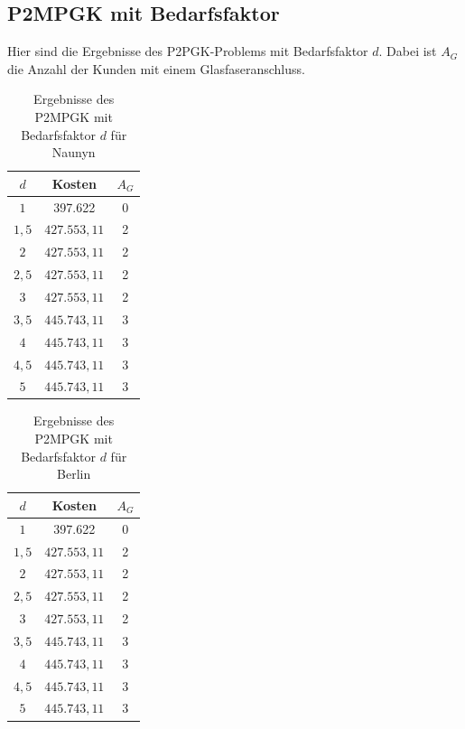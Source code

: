 \documentclass[11pt,a4paper]{article}
\theoremstyle{my_th_style1}
\begin{document}
\subsection*{P2MPGK mit Bedarfsfaktor}
Hier sind die Ergebnisse des P2PGK-Problems mit Bedarfsfaktor $d$. Dabei ist $A_G$ die Anzahl der Kunden mit einem Glasfaseranschluss.
\begin{table}[h]
	\centering
		\begin{tabular}{c|c|c}
	\centering
	$d$ & Kosten & $A_G$ \\	
	\hline
	$1$   	 &  397.622 & 0  \\
	$1,5$ 	&   $427.553,11$  & 2  \\
	$2$   	&   $427.553,11$ & 2  \\
	$2,5$   	&   $427.553,11$ & 2  \\
	$3$    &   $427.553,11$ & 2  \\
	$3,5$   	&   $445.743,11$ & 3  \\
	$4$   	&   $445.743,11$& 3  \\
	$4,5$    & $445.743,11$ & 3 \\
	$5$   	&   $445.743,11$& 3  \\
\end{tabular}
	\label{P2MPGKBedarfN}
	\caption{Ergebnisse des P2MPGK mit Bedarfsfaktor $d$ f\"ur Naunyn} 
\end{table}

\begin{table}[h]
			\centering
			\begin{tabular}{c|c|c}
				\centering
				$d$ & Kosten & $A_G$ \\	
		\hline
	$1$   	 &  397.622 & 0  \\
	$1,5$ 	&   $427.553,11$  & 2  \\
	$2$   	&   $427.553,11$ & 2  \\
	$2,5$   	&   $427.553,11$ & 2  \\
	$3$    &   $427.553,11$ & 2  \\
	$3,5$   	&   $445.743,11$ & 3  \\
	$4$   	&   $445.743,11$& 3  \\
	$4,5$    & $445.743,11$ & 3 \\
	$5$   	&   $445.743,11$& 3  \\	
			\end{tabular}
			\label{P2PGKBedarfB}
			\caption{Ergebnisse des P2MPGK mit Bedarfsfaktor $d$ f\"ur Berlin} 
\end{table}
\end{document}

